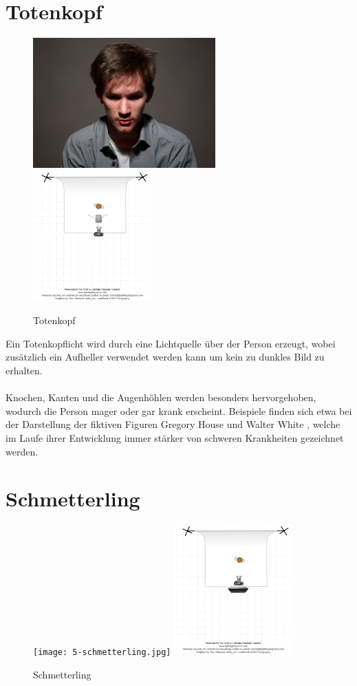 \documentclass{school}
\begin{document}
\section{Totenkopf}
\begin{figure}[h]
	\centering
	\includegraphics[height=5cm]{4-totenkopf.jpg}
	\includegraphics[height=5cm]{4-totenkopf-diagram.png}
	\caption{Totenkopf}
\end{figure}

Ein Totenkopflicht wird durch eine Lichtquelle über der Person erzeugt, wobei zusätzlich ein Aufheller verwendet werden kann um kein zu dunkles Bild zu erhalten.
\\\\
Knochen, Kanten und die Augenhöhlen werden besonders hervorgehoben, wodurch die Person mager oder gar krank erscheint. Beispiele finden sich etwa bei der Darstellung der fiktiven Figuren Gregory House \cite{gregory-house} und Walter White \cite{walter-white}, welche im Laufe ihrer Entwicklung immer stärker von schweren Krankheiten gezeichnet werden.

\section{Schmetterling}
\begin{figure}[h]
	\centering
	\texttt{[image: 5-schmetterling.jpg]}
	\includegraphics[height=5cm]{5-schmetterling-diagram.png}
	\caption{Schmetterling}
\end{figure}
\end{document}
